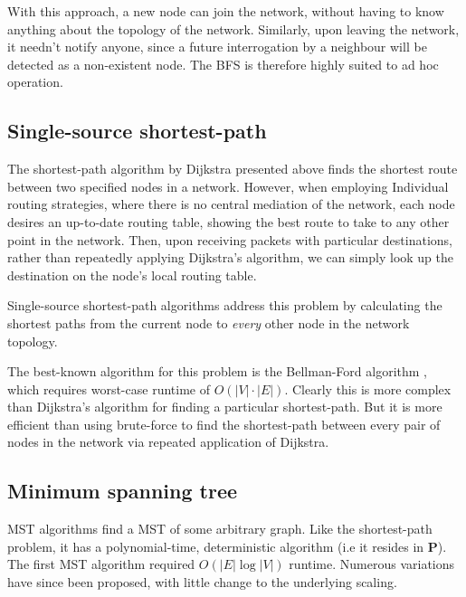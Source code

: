 \documentclass[aps,rmp,twocolumn,amsmath,amssymb,nofootinbib,superscriptaddress,longbibliography,floatfix]{revtex4-1}
\begin{document}
With this approach, a new node can join the network, without having to know anything about the topology of the network. Similarly, upon leaving the network, it needn't notify anyone, since a future interrogation by a neighbour will be detected as a non-existent node. The BFS is therefore highly suited to ad hoc operation.

%
%

\subsection{Single-source shortest-path}

The shortest-path algorithm by Dijkstra presented above finds the shortest route between two specified nodes in a network. However, when employing {\sc Individual} routing strategies, where there is no central mediation of the network, each node desires an up-to-date routing table, showing the best route to take to any other point in the network. Then, upon receiving packets with particular destinations, rather than repeatedly applying Dijkstra's algorithm, we can simply look up the destination on the node's local routing table.

Single-source shortest-path algorithms address this problem by calculating the shortest paths from the current node to \emph{every} other node in the network topology.

The best-known algorithm for this problem is the Bellman-Ford algorithm \cite{BF}, which requires worst-case runtime of $O(|V|\cdot |E|)$. Clearly this is more complex than Dijkstra's algorithm for finding a particular shortest-path. But it is more efficient than using brute-force to find the shortest-path between every pair of nodes in the network via repeated application of Dijkstra.

%
%

\subsection{Minimum spanning tree} \label{sec:min_tree}

MST algorithms find a MST of some arbitrary graph. Like the shortest-path problem, it has a polynomial-time, deterministic algorithm (i.e it resides in \textbf{P}). The first MST algorithm \cite{bib:Boruvka26} required $O(|E|\log |V|)$ runtime. Numerous variations have since been proposed, with little change to the underlying scaling.
\end{document}
